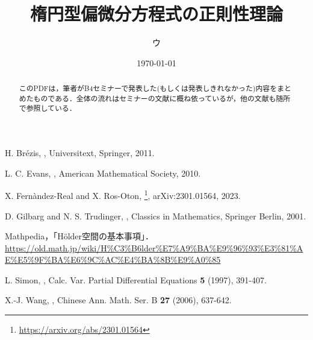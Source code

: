 \documentclass[a4paper]{ltjsarticle}
\newcommand{\1}{\mathbbm{1}}
\numberwithin{equation}{section}
\theoremstyle{definition}
\begin{document}
\title{楕円型偏微分方程式の正則性理論}
\author{ウ}
\date{\today}
\maketitle
\begin{abstract}
    このPDFは，筆者がB4セミナーで発表した(もしくは発表しきれなかった)内容をまとめたものである．全体の流れはセミナーの文献\cite{fr}に概ね依っているが，他の文献も随所で参照している．
\end{abstract}
\tableofcontents
\newpage
\begin{thebibliography}{99}
    H. Brézis, 
    ,
    \newblock Universitext, Springer, 2011.

    L. C. Evans, 
    ,
    \newblock American Mathematical Society, 2010.

    X. Fernàndez-Real and X. Ros-Oton, 
    \footnote{\url{https://arxiv.org/abs/2301.01564}},
    \newblock arXiv:2301.01564, 2023.

    D. Gilbarg and N. S. Trudinger, 
    ,
    \newblock Classics in Mathematics, Springer Berlin, 2001.

    Mathpedia，「Hölder空間の基本事項」．\url{https://old.math.jp/wiki/H%C3%B6lder%E7%A9%BA%E9%96%93%E3%81%AE%E5%9F%BA%E6%9C%AC%E4%BA%8B%E9%A0%85}

    L. Simon, 
    , 
    \newblock Calc. Var. Partial Differential Equations \textbf{5} (1997), 391-407.

    X.-J. Wang, 
    ,
    \newblock Chinese Ann. Math. Ser. B \textbf{27} (2006), 637-642.
\end{thebibliography}
\newpage
\end{document}
